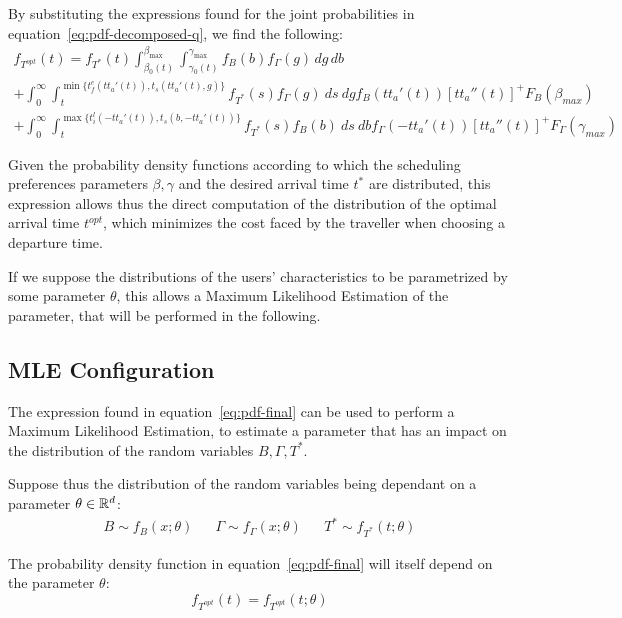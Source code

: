 By substituting the expressions found for the joint probabilities in equation~\eqref{eq:pdf-decomposed-q},
we find the following:
\begin{multline}
  \label{eq:pdf-final}
    f_{T^{opt}}(t) = f_{T^*}(t)\int_{\beta_0(t)}^{\beta_{\text{max}}}\int_{\gamma_0(t)}^{\gamma_{\text{max}}}f_B(b)f_\Gamma(g)\, dg\, db \\
    + \int_0^\infty \int_t^{\min\{t_f^e(tt_a'(t)), t_s(tt_a'(t), g)\}}f_{T^*}(s) f_\Gamma(g)\ ds\ dg f_B(tt_a'(t)) [tt_a''(t)]^+F_B(\beta_{max}) \\
    + \int_0^\infty \int_t^{\max\{t_i^l(-tt_a'(t)), t_s(b, -tt_a'(t))\}}f_{T^*}(s) f_B(b)\ ds\ db f_\Gamma(-tt_a'(t)) [tt_a''(t)]^+F_\Gamma(\gamma_{max})
\end{multline}

Given the probability density functions according to which the scheduling preferences parameters \(\beta, \gamma\) and the desired arrival time \(t^*\) are distributed,
this expression allows thus the direct computation of the distribution of the optimal arrival time \(t^{opt}\),
which minimizes the cost faced by the traveller when choosing a departure time.

If we suppose the distributions of the users' characteristics to be parametrized by some parameter \(\theta\),
this allows a Maximum Likelihood Estimation of the parameter,
that will be performed in the following.

\subsection{MLE Configuration}

The expression found in equation~\eqref{eq:pdf-final} can be used to perform a Maximum Likelihood Estimation,
to estimate a parameter that has an impact on the distribution of the random variables \(B, \Gamma, T^*\).

Suppose thus the distribution of the random variables being dependant on a parameter \(\theta \in \mathbb{R}^d\):
\begin{align*}
  B \sim f_B(x; \theta) && \Gamma \sim f_\Gamma(x; \theta) && T^* \sim f_{T^*}(t; \theta)
\end{align*}

The probability density function in equation~\eqref{eq:pdf-final} will itself depend on the parameter \(\theta\):
\begin{equation*}
  f_{T^{opt}}(t) = f_{T^{opt}}(t; \theta)
\end{equation*}

